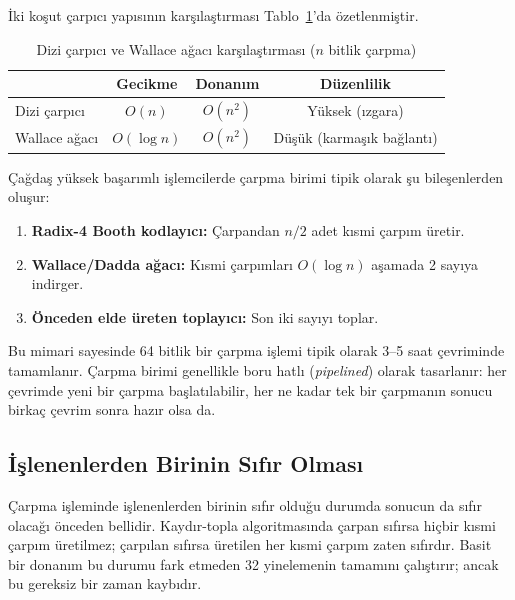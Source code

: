 İki koşut çarpıcı yapısının karşılaştırması Tablo~\ref{tab:dizi-vs-wallace}'da özetlenmiştir.

\begin{table}[htbp]
\centering
\caption{Dizi çarpıcı ve Wallace ağacı karşılaştırması ($n$ bitlik çarpma)}
\label{tab:dizi-vs-wallace}
\small
\begin{tabular}{l c c c}
\toprule
& \textbf{Gecikme} & \textbf{Donanım} & \textbf{Düzenlilik} \\
\midrule
Dizi çarpıcı & $O(n)$ & $O(n^2)$ & Yüksek (ızgara) \\
Wallace ağacı & $O(\log n)$ & $O(n^2)$ & Düşük (karmaşık bağlantı) \\
\bottomrule
\end{tabular}
\end{table}

\FloatBarrier
\begin{bilginot}
Çağdaş y{\"u}ksek ba{\c{s}}ar{\i}ml{\i} i{\c{s}}lemcilerde \c{c}arpma birimi tipik olarak {\c{s}}u bile{\c{s}}enlerden olu{\c{s}}ur:
\begin{enumerate}[nosep]
    \item \textbf{Radix-4 Booth kodlayıcı:} Çarpandan $n/2$ adet kısmi çarpım üretir.
    \item \textbf{Wallace/Dadda ağacı:} Kısmi çarpımları $O(\log n)$ aşamada 2 sayıya indirger.
    \item \textbf{Önceden elde üreten toplayıcı:} Son iki sayıyı toplar.
\end{enumerate}
Bu mimari sayesinde 64 bitlik bir çarpma işlemi tipik olarak 3--5 saat çevriminde tamamlanır. Çarpma birimi genellikle boru hatlı (\emph{pipelined}) olarak tasarlanır: her çevrimde yeni bir çarpma başlatılabilir, her ne kadar tek bir çarpmanın sonucu birkaç çevrim sonra hazır olsa da.
\end{bilginot}

\subsection{İşlenenlerden Birinin Sıfır Olması}

Çarpma işleminde işlenenlerden birinin sıfır olduğu durumda sonucun da sıfır olacağı önceden bellidir. Kaydır-topla algoritmasında çarpan sıfırsa hiçbir kısmi çarpım üretilmez; çarpılan sıfırsa üretilen her kısmi çarpım zaten sıfırdır. Basit bir donanım bu durumu fark etmeden 32 yinelemenin tamamını çalıştırır; ancak bu gereksiz bir zaman kaybıdır.

